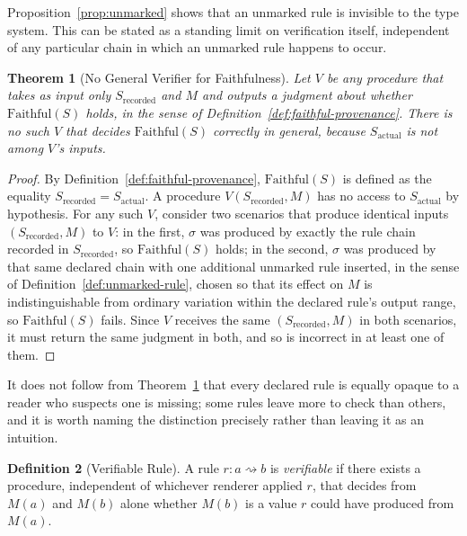 \documentclass[11pt]{article}
\newtheorem{theorem}{Theorem}[section]
\theoremstyle{definition}
\newtheorem{definition}[theorem]{Definition}
\begin{document}
Proposition~\ref{prop:unmarked} shows that an unmarked rule is invisible to the type system. This can be stated as a standing limit on verification itself, independent of any particular chain in which an unmarked rule happens to occur.

\begin{theorem}[No General Verifier for Faithfulness]
\label{thm:no-verifier}
Let $V$ be any procedure that takes as input only $S_{\mathrm{recorded}}$ and $M$ and outputs a judgment about whether $\mathrm{Faithful}(S)$ holds, in the sense of Definition~\ref{def:faithful-provenance}. There is no such $V$ that decides $\mathrm{Faithful}(S)$ correctly in general, because $S_{\mathrm{actual}}$ is not among $V$'s inputs.
\end{theorem}

\begin{proof}
By Definition~\ref{def:faithful-provenance}, $\mathrm{Faithful}(S)$ is defined as the equality $S_{\mathrm{recorded}} = S_{\mathrm{actual}}$. A procedure $V(S_{\mathrm{recorded}}, M)$ has no access to $S_{\mathrm{actual}}$ by hypothesis. For any such $V$, consider two scenarios that produce identical inputs $(S_{\mathrm{recorded}}, M)$ to $V$: in the first, $\sigma$ was produced by exactly the rule chain recorded in $S_{\mathrm{recorded}}$, so $\mathrm{Faithful}(S)$ holds; in the second, $\sigma$ was produced by that same declared chain with one additional unmarked rule inserted, in the sense of Definition~\ref{def:unmarked-rule}, chosen so that its effect on $M$ is indistinguishable from ordinary variation within the declared rule's output range, so $\mathrm{Faithful}(S)$ fails. Since $V$ receives the same $(S_{\mathrm{recorded}}, M)$ in both scenarios, it must return the same judgment in both, and so is incorrect in at least one of them.
\end{proof}

It does not follow from Theorem~\ref{thm:no-verifier} that every declared rule is equally opaque to a reader who suspects one is missing; some rules leave more to check than others, and it is worth naming the distinction precisely rather than leaving it as an intuition.

\begin{definition}[Verifiable Rule]
\label{def:verifiable-rule}
A rule $r : a \rightsquigarrow b$ is \emph{verifiable} if there exists a procedure, independent of whichever renderer applied $r$, that decides from $M(a)$ and $M(b)$ alone whether $M(b)$ is a value $r$ could have produced from $M(a)$.
\end{definition}
\end{document}
